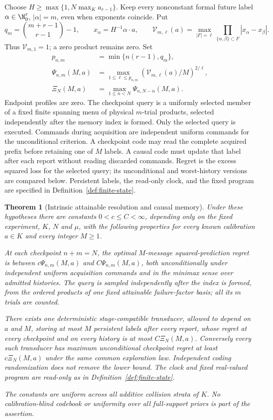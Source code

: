 \documentclass[11pt]{amsart}
\newtheorem{theorem}{Theorem}[section]
\theoremstyle{definition}\newtheorem{definition}[theorem]{Definition}
\theoremstyle{remark}\newtheorem{remark}[theorem]{Remark}
\begin{document}
Choose $H\ge\max\{1,N\max_K a_{r-1}\}$. Keep every nonconstant
formal future label $\alpha\in\N_0^r$, $|\alpha|=m$, even when
exponents coincide. Put
\[
 q_m=\binom{m+r-1}{r-1}-1,\qquad x_\alpha=H^{-1}\alpha\cdot a,
 \qquad
 \mathcal V_{m,\ell}(a)=\max_{|F|=\ell}
       \prod_{\{\alpha,\beta\}\subset F}|x_\alpha-x_\beta|.
\]
Thus $\mathcal V_{m,1}=1$; a zero product remains zero. Set
\[
 \begin{split}
 p_{n,m}&=\min\{n(r-1),q_m\},\\
 \Psi_{n,m}(M,a)&=\max_{1\le\ell\le p_{n,m}}
       (\mathcal V_{m,\ell}(a)/M)^{2/\ell},\\
 \Xi_N(M,a)&=\max_{1\le n<N}\Psi_{n,N-n}(M,a).
 \end{split}
\]
Endpoint profiles are zero. The checkpoint query is a uniformly selected
member of a fixed finite spanning menu of physical $m$-trial products,
selected independently after the memory index is formed. Only the
selected query is executed. Commands during acquisition are independent
uniform commands for the unconditional criterion. A checkpoint code may read the complete acquired prefix before retaining
one of $M$ labels. A causal code must update that label after each report
without reading discarded commands. Regret is the excess squared loss
for the selected query; its unconditional and worst-history versions
are compared below. Persistent labels, the read-only clock, and the fixed
program are specified in Definition~\ref{def:finite-state}.

\begin{theorem}[Intrinsic attainable resolution and causal memory]\label{thm:resolution-main}
Under these hypotheses there are constants $0<c\le C<\infty$,
depending only on the fixed experiment, $K$, $N$ and $\mu$, with the
following properties for every known calibration $a\in K$ and every
integer $M\ge1$.

At each checkpoint $n+m=N$, the optimal $M$-message squared-prediction
regret is between $c\Psi_{n,m}(M,a)$ and $C\Psi_{n,m}(M,a)$,
both unconditionally under independent uniform acquisition commands and
in the minimax sense over admitted histories. The query is sampled
independently after the index is formed, from the ordered products of
one fixed attainable failure-factor basis; all its $m$ trials are counted.

There exists one deterministic stage-compatible transducer, allowed to
depend on $a$ and $M$, storing at most $M$ persistent labels after
every report, whose regret at every checkpoint and on every history is
at most $C\Xi_N(M,a)$. Conversely every such transducer has maximum
unconditional checkpoint regret at least $c\Xi_N(M,a)$ under the
same common exploration law. Independent coding randomization does not
remove the lower bound. The clock and fixed real-valued program are
read-only as in Definition~\ref{def:finite-state}.

The constants are uniform across all additive collision strata of $K$.
No calibration-blind codebook or uniformity over all full-support priors
is part of the assertion.
\end{theorem}
\end{document}
